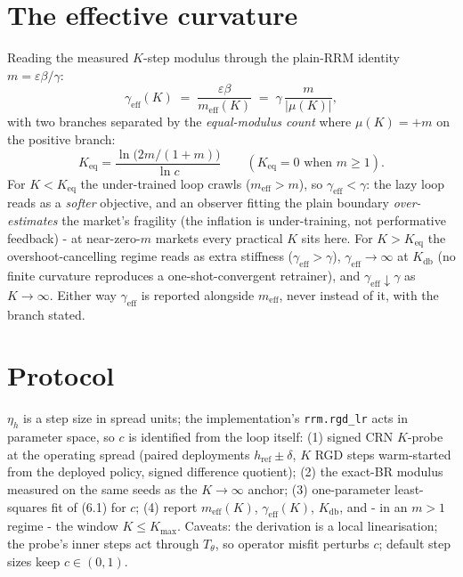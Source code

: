 \documentclass[11pt]{article}
\newcommand{\eps}{\varepsilon}
\newcommand{\code}[1]{\texttt{#1}}
\newcommand{\meff}{m_{\mathrm{eff}}}
\newcommand{\geff}{\gamma_{\mathrm{eff}}}
\begin{document}
\section{The effective curvature}

Reading the measured $K$-step modulus through the plain-RRM identity
$m = \eps\beta/\gamma$:
\begin{equation}
  \geff(K) \;=\; \frac{\eps\beta}{\meff(K)} \;=\; \gamma\,\frac{m}{|\mu(K)|},
  \tag{6.4}
\end{equation}
with two branches separated by the \emph{equal-modulus count} where
$\mu(K) = +m$ on the positive branch:
\begin{equation}
  K_{\mathrm{eq}} = \frac{\ln\!\big(2m/(1+m)\big)}{\ln c}
  \qquad (K_{\mathrm{eq}} = 0 \text{ when } m \ge 1).
  \tag{6.5}
\end{equation}
For $K < K_{\mathrm{eq}}$ the under-trained loop crawls ($\meff > m$), so
$\geff < \gamma$: the lazy loop reads as a \emph{softer} objective, and an
observer fitting the plain boundary \emph{over-estimates} the market's
fragility (the inflation is under-training, not performative feedback) - at
near-zero-$m$ markets every practical $K$ sits here. For $K > K_{\mathrm{eq}}$
the overshoot-cancelling regime reads as extra stiffness ($\geff > \gamma$),
$\geff \to \infty$ at $K_{\mathrm{db}}$ (no finite curvature reproduces a
one-shot-convergent retrainer), and $\geff \downarrow \gamma$ as
$K \to \infty$. Either way $\geff$ is reported alongside $\meff$, never
instead of it, with the branch stated.

\section{Protocol}

$\eta_h$ is a step size in spread units; the implementation's
\code{rrm.rgd\_lr} acts in parameter space, so $c$ is identified from the loop
itself: (1) signed CRN $K$-probe at the operating spread (paired deployments
$h_{\mathrm{ref}}\pm\delta$, $K$ RGD steps warm-started from the deployed
policy, signed difference quotient); (2) the exact-BR modulus measured on the
same seeds as the $K\to\infty$ anchor; (3) one-parameter least-squares fit of
(6.1) for $c$; (4) report $\meff(K)$, $\geff(K)$, $K_{\mathrm{db}}$, and - in
an $m>1$ regime - the window $K \le K_{\max}$. Caveats: the derivation is a
local linearisation; the probe's inner steps act through $T_\theta$, so
operator misfit perturbs $c$; default step sizes keep $c\in(0,1)$.
\end{document}
